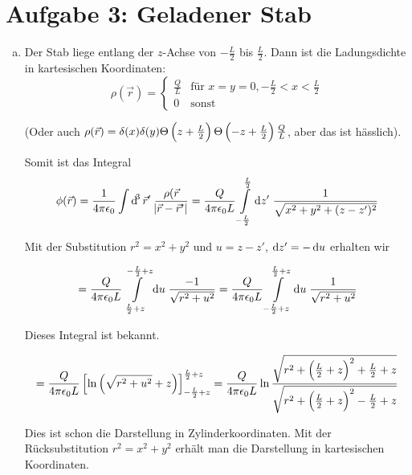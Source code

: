 \documentclass[a4paper,german,12pt,smallheadings]{scrartcl}
\begin{document}
\section*{Aufgabe 3: Geladener Stab}
\begin{enumerate}[a)]
  \item
    Der Stab liege entlang der $z$-Achse von $-\frac{L}{2}$ bis $\frac{L}{2}$.
    Dann ist die Ladungsdichte in kartesischen Koordinaten:
    \begin{equation}
      \rho(\vec{r}) = \begin{cases}
        \frac{Q}{L} &\mbox{für } x = y = 0, -\frac{L}{2} < x < \frac{L}{2} \\
        0           &\mbox{sonst}
      \end{cases}
    \end{equation}

    (Oder auch $\rho(\vec{r}) = \delta(x) \delta(y) \Theta\del{z + \frac{L}{2}}
    \Theta\del{-z + \frac{L}{2}} \frac{Q}{L}$, aber das ist hässlich).

    Somit ist das Integral
    \begin{equation}
      \phi(\vec{r}) = \frac{1}{4 \pi \epsilon_0} \int \dif^3\vec{r}' \; \frac{\rho(\vec{r}}{\envert{\vec{r} - \vec{r}'}}
      =
      \frac{Q}{4 \pi \epsilon_0 L} \int\limits_{-\frac{L}{2}}^{\frac{L}{2}} \dif z' \; \frac{1}{\sqrt{x^2 + y^2 + (z - z')^2}}
    \end{equation}

    Mit der Substitution $r^2 = x^2 + y^2$ und $u = z - z'$, $\dif z' = - \dif u$ erhalten wir

    \begin{equation}
      = \frac{Q}{4 \pi \epsilon_0 L} \int\limits_{\frac{L}{2}+z}^{-\frac{L}{2}+z} \dif u \; \frac{-1}{\sqrt{r^2 + u^2}}
      = \frac{Q}{4 \pi \epsilon_0 L} \int\limits_{-\frac{L}{2}+z}^{\frac{L}{2}+z} \dif u \; \frac{1}{\sqrt{r^2 + u^2}}
    \end{equation}

    Dieses Integral ist bekannt.

    \begin{equation}
      = \frac{Q}{4 \pi \epsilon_0 L} \sbr[2]{\ln\del{ \sqrt{r^2 + u^2} + z}}_{-\frac{L}{2} + z}^{\frac{L}{2} + z}
      = \frac{Q}{4 \pi \epsilon_0 L} \ln \frac{
        \sqrt{r^2 + \del{\frac{L}{2} + z}^2 + \frac{L}{2} + z}
      }{
        \sqrt{r^2 + \del{\frac{L}{2} + z}^2 - \frac{L}{2} + z}
      }
    \end{equation}

    Dies ist schon die Darstellung in Zylinderkoordinaten. Mit der
    Rücksubstitution $r^2 = x^2 + y^2$ erhält man die Darstellung in
    kartesischen Koordinaten.
\end{enumerate}
\end{document}
